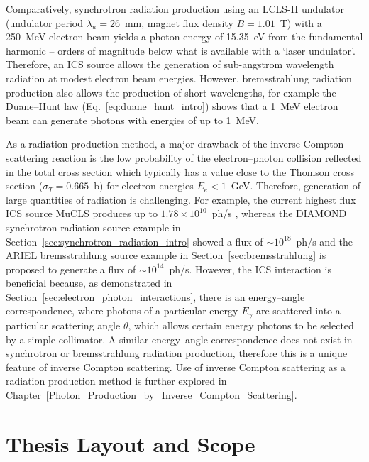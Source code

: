 \documentclass[../main.tex]{subfiles}
\begin{document}
Comparatively, synchrotron radiation production using an LCLS-II undulator (undulator period $\lambda_{u} = 26$~\si{\milli\meter}, magnet flux density $B = 1.01$~\si{\tesla}) \cite{wallen2016status} with a 250~\si{\mega\electronvolt} electron beam yields a photon energy of 15.35~\si{\electronvolt} from the fundamental harmonic -- orders of magnitude below what is available with a `laser undulator'. Therefore, an ICS source allows the generation of sub-angstrom wavelength radiation at modest electron beam energies. However, bremsstrahlung radiation production also allows the production of short wavelengths, for example the Duane--Hunt law (Eq.~\ref{eq:duane_hunt_intro}) shows that a 1~\si{\mega\electronvolt} electron beam can generate photons with energies of up to 1~\si{\mega\electronvolt}.

As a radiation production method, a major drawback of the inverse Compton scattering reaction is the low probability of the electron--photon collision reflected in the total cross section which typically has a value close to the Thomson cross section ($\sigma_{T} = 0.665$~\si{\barn}) for electron energies $E_{e} < 1$~\si{\giga\electronvolt}. Therefore, generation of large quantities of radiation is challenging. For example, the current highest flux ICS source MuCLS produces up to $1.78\times 10^{10}$~ph/\si{\second} \cite{eggl2016munich}, whereas the DIAMOND synchrotron radiation source example in Section~\ref{sec:synchrotron_radiation_intro} showed a flux of $\sim 10^{18}$~ph/\si{\second} and the ARIEL bremsstrahlung source example in Section~\ref{sec:bremsstrahlung} is proposed to generate a flux of $\sim 10^{14}$~ph/\si{\second}. However, the ICS interaction is beneficial because, as demonstrated in Section~\ref{sec:electron_photon_interactions}, there is an energy--angle correspondence, where photons of a particular energy $E_{\gamma}$ are scattered into a particular scattering angle $\theta$, which allows certain energy photons to be selected by a simple collimator. A similar energy--angle correspondence does not exist in synchrotron or bremsstrahlung radiation production, therefore this is a unique feature of inverse Compton scattering. Use of inverse Compton scattering as a radiation production method is further explored in Chapter~\ref{Photon_Production_by_Inverse_Compton_Scattering}. 

\section{Thesis Layout and Scope}
\label{sec:thesis_layout_scope}
\end{document}
